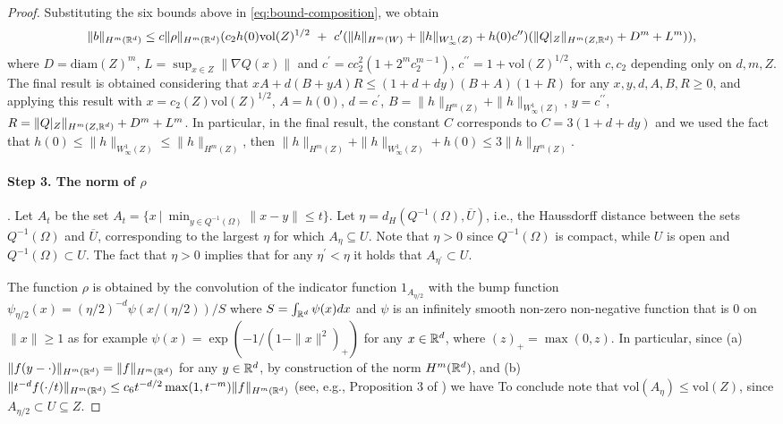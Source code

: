 \begin{proof}
{}
Substituting the six bounds above in \cref{eq:bound-composition}, we obtain
$$
\|b\|_{H^m(\mathbb R^d)} \leq c \|\rho\|_{H^m(\mathbb R^d)}(c_2 h(0) \textrm{vol}(Z)^{1/2} ~+~ c^\prime ( \|h\|_{H^m(W)} + \|h\|_{W^1_\infty(Z)} + h(0) c^{\prime\prime})(\|Q|_Z\|_{H^m(Z, \mathbb R^d)} + D^m + L^m)),
$$
where $D =\textrm{diam}(Z)^m $, $L = \sup_{x \in Z} \|\nabla Q (x)\|$ and $c^\prime = c c_2^2 (1 + 2^m c_2^{m-1})$, $c^{\prime\prime}=1+\textrm{vol}(Z)^{1/2}$, with $c, c_2$ depending only on $d, m, Z$.
The final result is obtained considering that $x A + d (B + y A) R \leq (1+ d + d y)(B+A)(1+R)$ for any $x,y,d,A,B, R \geq 0$, and applying this result with $x=c_2(Z)\textrm{vol}(Z)^{1/2}$, $A = h(0)$, $d = c^\prime$, $B = \|h\|_{H^m(Z)} + \|h\|_{W^1_\infty(Z)}$, $y= c^{\prime \prime}$, $R = \|Q|_Z\|_{H^m(Z, \mathbb R^d)} + D^m + L^m$. In particular, in the final result, the constant $C$ corresponds to $C = 3(1+ d + d y)$ and we used the fact that $h(0) \leq \|h\|_{W^1_\infty(Z)} \leq \|h\|_{H^m(Z)}$, then $\|h\|_{H^m(Z)} + \|h\|_{W^1_\infty(Z)} + h(0) \leq 3 \|h\|_{H^m(Z)}$.


\paragraph{Step 3. The norm of $\rho$}.  Let $A_{t}$ be the set $A_{t} = \{x ~|~ \min_{y \in Q^{-1}(\Omega)} \|x-y\| \leq t\}$. Let $\eta = d_H(Q^{-1}(\Omega), \overline{U})$, i.e., the Haussdorff distance between the sets $Q^{-1}(\Omega)$ and $\overline{U}$, corresponding to the largest $\eta$ for which $A_\eta \subseteq U$. Note that $\eta > 0$ since $Q^{-1}(\Omega)$ is compact, while $U$ is open and $Q^{-1}(\Omega) \subset U$. The fact that $\eta > 0$ implies that for any $\eta^\prime < \eta$ it holds that $A_{\eta^\prime} \subset U$.

The function $\rho$ is obtained by the convolution of the indicator function $1_{A_{\eta/2}}$ with the bump function $\psi_{\eta/2}(x) =  (\eta/2)^{-d} \psi(x/(\eta/2))/S$ where $S = \int_{\mathbb R^d} \psi(x) dx$ and $\psi$ is an infinitely smooth non-zero non-negative function that is $0$ on $\|x\| \geq 1$ as for example $\psi(x) = \exp(-1/(1-\|x\|^2)_+)$ for any $x \in \mathbb R^d$, where $(z)_+ = \max(0,z)$. In particular, since (a) $\|f(y-\cdot)\|_{H^m(\mathbb R^d)} = \|f\|_{H^m(\mathbb R^d)}$ for any $y \in \mathbb R^d$, by construction of the norm $H^m(\mathbb R^d)$, and (b) $\|t^{-d} f(\cdot/t)\|_{H^m(\mathbb R^d)} \leq c_6 t^{-d/2} \max(1,t^{-m}) \|f\|_{H^m(\mathbb R^d)}$ (see, e.g., Proposition 3 of \citealp{runst2011sobolev}) we have
To conclude note that $\textrm{vol}(A_\eta) \leq \textrm{vol}(Z)$, since $A_{\eta/2} \subset U \subseteq Z$.
\end{proof}


